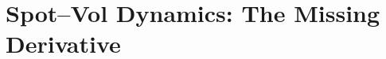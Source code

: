 %
\renewcommand{\figdir}{figures/ch09}
\chapter[Spot--vol dynamics: the missing derivative]{Spot--Vol
  Dynamics: The Missing Derivative}
\label{ch:ssr}

